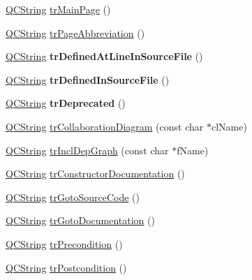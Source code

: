 \begin{DoxyCompactItemize}
\item 
\mbox{\hyperlink{class_q_c_string}{Q\+C\+String}} \mbox{\hyperlink{class_translator_italian_a49d20e0dd3406a6ff03a7d6a4f265852}{tr\+Main\+Page}} ()
\item 
\mbox{\hyperlink{class_q_c_string}{Q\+C\+String}} \mbox{\hyperlink{class_translator_italian_a2a749b009f36458a6c6c5eefd3ee21c3}{tr\+Page\+Abbreviation}} ()
\item 
\mbox{\label{class_translator_italian_ae5edc98e358cf8321111742bb82acb9c}} 
\mbox{\hyperlink{class_q_c_string}{Q\+C\+String}} {\bfseries tr\+Defined\+At\+Line\+In\+Source\+File} ()
\item 
\mbox{\label{class_translator_italian_a5a8e3000335022e49b2cd08d7ce10ae7}} 
\mbox{\hyperlink{class_q_c_string}{Q\+C\+String}} {\bfseries tr\+Defined\+In\+Source\+File} ()
\item 
\mbox{\label{class_translator_italian_ad33ecd812bf419ed76440df1ab94c3e0}} 
\mbox{\hyperlink{class_q_c_string}{Q\+C\+String}} {\bfseries tr\+Deprecated} ()
\item 
\mbox{\hyperlink{class_q_c_string}{Q\+C\+String}} \mbox{\hyperlink{class_translator_italian_a5750ef5b048366564b190a2c3e24dd35}{tr\+Collaboration\+Diagram}} (const char $\ast$cl\+Name)
\item 
\mbox{\hyperlink{class_q_c_string}{Q\+C\+String}} \mbox{\hyperlink{class_translator_italian_aa8541ec29453686a4f580570e3b11e13}{tr\+Incl\+Dep\+Graph}} (const char $\ast$f\+Name)
\item 
\mbox{\hyperlink{class_q_c_string}{Q\+C\+String}} \mbox{\hyperlink{class_translator_italian_aff7449d7a634f167b55fc326d2ac699c}{tr\+Constructor\+Documentation}} ()
\item 
\mbox{\hyperlink{class_q_c_string}{Q\+C\+String}} \mbox{\hyperlink{class_translator_italian_a57957a95d5e40009eacb73ac58879bde}{tr\+Goto\+Source\+Code}} ()
\item 
\mbox{\hyperlink{class_q_c_string}{Q\+C\+String}} \mbox{\hyperlink{class_translator_italian_ad1422e8d28f9d6502a04c78e76d023ba}{tr\+Goto\+Documentation}} ()
\item 
\mbox{\hyperlink{class_q_c_string}{Q\+C\+String}} \mbox{\hyperlink{class_translator_italian_ab5e955adbe95973acf3cda6d80a8e221}{tr\+Precondition}} ()
\item 
\mbox{\hyperlink{class_q_c_string}{Q\+C\+String}} \mbox{\hyperlink{class_translator_italian_afc5c938520e7d79a1751750bd01683c3}{tr\+Postcondition}} ()

\end{DoxyCompactItemize}
